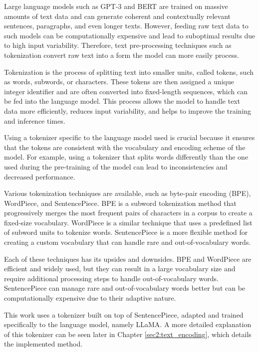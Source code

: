     Large language models such as GPT-3 \cite{brownLanguageModelsAre2020} and BERT \cite{devlinBERTPretrainingDeep2019} are trained on massive amounts of text data and can generate coherent and contextually relevant sentences, paragraphs, and even longer texts. However, feeding raw text data to such models can be computationally expensive and lead to suboptimal results due to high input variability. Therefore, text pre-processing techniques such as tokenization convert raw text into a form the model can more easily process.
    
    Tokenization is the process of splitting text into smaller units, called tokens, such as words, subwords, or characters. These tokens are then assigned a unique integer identifier and are often converted into fixed-length sequences, which can be fed into the language model. This process allows the model to handle text data more efficiently, reduces input variability, and helps to improve the training and inference times.
    
    Using a tokenizer specific to the language model used is crucial because it ensures that the tokens are consistent with the vocabulary and encoding scheme of the model. For example, using a tokenizer that splits words differently than the one used during the pre-training of the model can lead to inconsistencies and decreased performance.
    
    Various tokenization techniques are available, such as byte-pair encoding (BPE), WordPiece, and SentencePiece. BPE is a subword tokenization method that progressively merges the most frequent pairs of characters in a corpus to create a fixed-size vocabulary. WordPiece is a similar technique that uses a predefined list of subword units to tokenize words. SentencePiece is a more flexible method for creating a custom vocabulary that can handle rare and out-of-vocabulary words.
    
    Each of these techniques has its upsides and downsides. BPE and WordPiece are efficient and widely used, but they can result in a large vocabulary size and require additional processing steps to handle out-of-vocabulary words. SentencePiece can manage rare and out-of-vocabulary words better but can be computationally expensive due to their adaptive nature.

    This work uses a tokenizer built on top of SentencePiece, adapted and trained specifically to the language model, namely LLaMA. A more detailed explanation of this tokenizer can be seen later in Chapter \ref{sec2:text_encoding}, which details the implemented method.